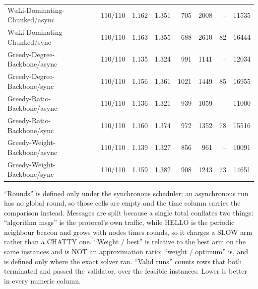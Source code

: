 \begin{table}[tb]
\begin{tabular}{lrrrrrrr}
WuLi-Dominating-Chunked/async & 110/110 & 1.162 & 1.351 & 705 & 2008 & -- & 11535 \\
WuLi-Dominating-Chunked/sync & 110/110 & 1.163 & 1.355 & 688 & 2610 & 82 & 16444 \\
Greedy-Degree-Backbone/async & 110/110 & 1.135 & 1.324 & 991 & 1141 & -- & 12034 \\
Greedy-Degree-Backbone/sync & 110/110 & 1.156 & 1.361 & 1021 & 1449 & 85 & 16955 \\
Greedy-Ratio-Backbone/async & 110/110 & 1.136 & 1.321 & 939 & 1059 & -- & 11000 \\
Greedy-Ratio-Backbone/sync & 110/110 & 1.160 & 1.374 & 972 & 1352 & 78 & 15516 \\
Greedy-Weight-Backbone/async & 110/110 & 1.139 & 1.327 & 856 & 961 & -- & 10091 \\
Greedy-Weight-Backbone/sync & 110/110 & 1.159 & 1.382 & 908 & 1243 & 73 & 14651 \\
\bottomrule
\end{tabular}
\begin{flushleft}\footnotesize
``Rounds'' is defined only under the synchronous scheduler; an asynchronous run has no global round, so those cells are empty and the time column carries the comparison instead. Messages are split because a single total conflates two things: ``algorithm msgs'' is the protocol's own traffic, while HELLO is the periodic neighbour beacon and grows with nodes times rounds, so it charges a SLOW arm rather than a CHATTY one. ``Weight / best'' is relative to the best arm on the same instances and is NOT an approximation ratio; ``weight / optimum'' is, and is defined only where the exact solver ran. ``Valid runs'' counts rows that both terminated and passed the validator, over the feasible instances. Lower is better in every numeric column.
\end{flushleft}
\end{table}
